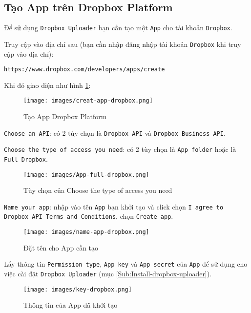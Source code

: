\subsection{Tạo App trên Dropbox Platform}
\label{Sub:dropbox-platform}
Để sử dụng \verb|Dropbox Uploader| bạn cần tạo một \verb|App| cho tài khoản \verb|Dropbox|.
\begin{list}{--}{}
\item Truy cập vào địa chỉ sau (bạn cần nhập đăng nhập tài khoản \verb|Dropbox| khi truy cập vào địa chỉ):
\begin{center}
\verb|https://www.dropbox.com/developers/apps/create|
\end{center}
\item Khi đó giao diện như hình \ref{Fig:creat-app-dropbox}:
\begin{figure}[!h]
\begin{center}
\texttt{[image: images/creat-app-dropbox.png]} 
\end{center}
\caption{Tạo \textsf{App} \textsf{Dropbox Platform}} \label{Fig:creat-app-dropbox}
\end{figure}
\begin{list}{+}{}
\item \verb|Choose an API|: có 2 tùy chọn là  \verb|Dropbox API| và \verb|Dropbox Business API|.
\item \verb|Choose the type of access you need|: có 2 tùy chọn là \verb|App folder| hoặc là \verb|Full Dropbox|.
\begin{figure}[!h]
\begin{center}
\texttt{[image: images/App-full-dropbox.png]} 
\end{center}
\caption{Tùy chọn của \textsf{Choose the type of access you need}} \label{Fig:App-full-dropbox}
\end{figure}
\item \verb|Name your app|: nhập vào tên \verb|App| bạn khởi tạo và click chọn \verb|I agree to Dropbox API Terms and Conditions|, chọn \verb|Create app|.
\begin{figure}[!h]
\begin{center}
\texttt{[image: images/name-app-dropbox.png]} 
\end{center}
\caption{Đặt tên cho App cần tạo} \label{Fig:name-app-dropbox}
\end{figure}
\end{list}
\item Lấy thông tin \verb|Permission type|, \verb|App key| và \verb|App secret| của \verb|App| để sử dụng cho việc cài đặt \verb|Dropbox Uploader| (mục \ref{Sub:Install-dropbox-uploader}).
\begin{figure}[!h]
\begin{center}
\texttt{[image: images/key-dropbox.png]} 
\end{center}
\caption{Thông tin của \textsf{App} đã khởi tạo} \label{Fig:key-app-dropbox}
\end{figure}
\end{list}
